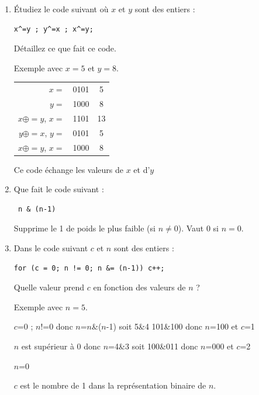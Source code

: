 \documentclass[11pt]{article}
\begin{document}
\begin{enumerate}
 \item Étudiez le code suivant où $x$ et $y$ sont des entiers :
\begin{verbatim}
x^=y ; y^=x ; x^=y;
\end{verbatim}
  Détaillez ce que fait ce code.

 \begin{solution}
 Exemple avec $x=5$ et $y=8$.

 \begin{tabular}{ r c c }
  $x=$ & 0101 & 5 \\
  $y=$ & 1000 & 8 \\
  $x\oplus=y$, $x=$ & 1101 & 13 \\
  $y\oplus=x$, $y=$ & 0101 & 5 \\
  $x\oplus=y$, $x=$ & 1000 & 8 \\
 \end{tabular}

 Ce code échange les valeurs de $x$ et d'$y$
\end{solution}

 \item Que fait le code suivant :

\begin{verbatim}
 n & (n-1)
\end{verbatim}

\begin{solution}

Supprime le 1 de poids le plus faible (si $n\ne0$). Vaut 0 si $n=0$.

\end{solution}

 \item Dans le code suivant $c$ et $n$ sont des entiers :
\begin{verbatim}
for (c = 0; n != 0; n &= (n-1)) c++;
\end{verbatim}
 Quelle valeur prend $c$ en fonction des valeurs de $n$ ?

\begin{solution}

Exemple avec $n=5$.

$c$=0 ; $n$!=0 donc $n$=$n$\&($n$-1) soit 5\&4 101\&100 donc $n$=100 et $c$=1

$n$ est supérieur à 0 donc $n$=4\&3 soit 100\&011 donc $n$=000 et $c$=2

$n$=0

$c$ est le nombre de 1 dans la représentation binaire de $n$.
\end{solution}


\end{enumerate}
\end{document}
